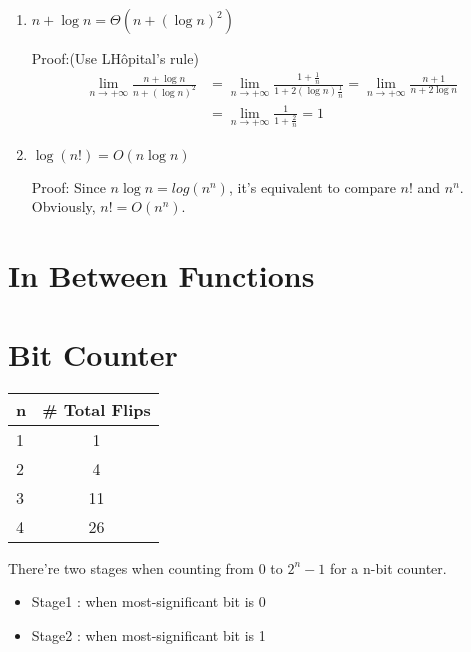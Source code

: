 \documentclass[11pt]{article}
\newenvironment{qparts}{\begin{enumerate}[{(}a{)}]}{\end{enumerate}}
\begin{document}
\begin{qparts}
\begin{enumerate}
 \item $n + \log n = \Theta(n + (\log n)^2)$
 
 Proof:(Use L\textquotesingle Hôpital's rule)
  \begin{align*}
  	\lim_{n \to+\infty} \frac{n + \log n}{n + (\log n)^2}
		&= \lim_{n \to+\infty} \frac{1 + \frac{1}{n}}{1 + 2(\log n)\frac{1}{n}} = \lim_{n \to+\infty}\frac{n +1}{n + 2\log n} \\
		&= \lim_{n \to+\infty} \frac{1}{1 + \frac{2}{n}} = 1
   \end{align*}
   
  \item $\log (n!) = O(n\log n)$
  
  Proof: Since $n\log n = log (n^n)$, it's equivalent to compare $n!$ and $n^n$. Obviously, $n! = O(n^n)$.
 
\end{enumerate}

\end{qparts}

\newpage
\section{In Between Functions}

\newpage
\section{Bit Counter}

\begin{tabular}{l | c}
    n	&   \# Total Flips  \\\hline
    1  &   1  \\  
    2  &   4  \\
    3  &   11 \\
    4  &   26 \\
\end{tabular}

There're two stages when counting from 0 to $2^n-1$ for a n-bit counter. 

\begin{itemize}
	\item Stage1 : when most-significant bit is 0
	\item Stage2 : when most-significant bit is 1
\end{itemize}
\end{document}
